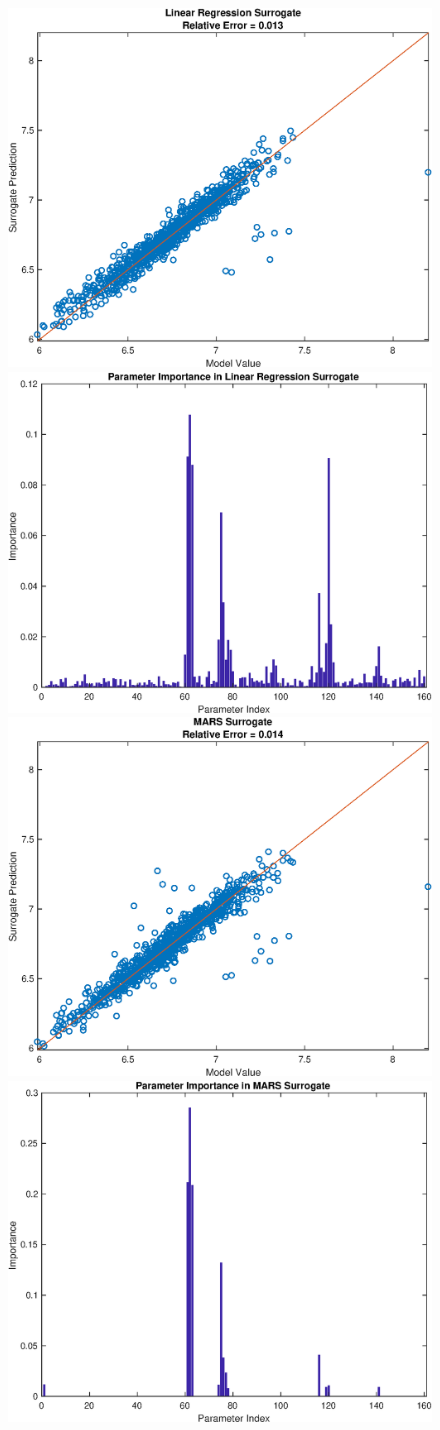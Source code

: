 \documentclass[12pt]{article}
\numberwithin{equation}{section}
\begin{document}
\begin{figure}[h]
\centering
\includegraphics[width=.49 \textwidth]{Figures/K_ECS_Mean_QoI_LR_Prediction_Rectangular.eps}
\includegraphics[width=.49 \textwidth]{Figures/K_ECS_Mean_QoI_LR_VI_Rectangular.eps}\\
\includegraphics[width=.49 \textwidth]{Figures/K_ECS_Mean_QoI_MARS_Prediction_Rectangular.eps}
\includegraphics[width=.49 \textwidth]{Figures/K_ECS_Mean_QoI_MARS_VI_Rectangular.eps}
\end{figure}
\end{document}
